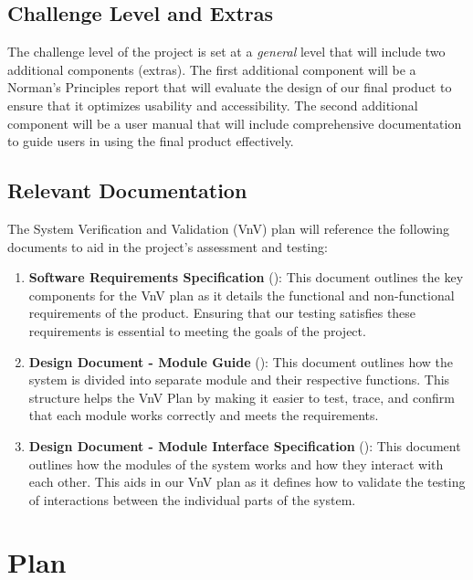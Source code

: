 \documentclass[12pt, titlepage]{article}
\begin{document}
\subsection{Challenge Level and Extras}

The challenge level of the project is set at a \textit{general} level that will include two additional 
components (extras). The first additional component will be a Norman's Principles report that will 
evaluate the design of our final product to ensure that it optimizes usability and accessibility. The second additional 
component will be a user manual that will include comprehensive documentation to guide users in using the final 
product effectively. 

\subsection{Relevant Documentation}
The System Verification and Validation (VnV) plan will reference the following documents to aid in 
the project's assessment and testing:
\begin{enumerate}
  \item \textbf{Software Requirements Specification} (\citet{SRS}): This document outlines the key components 
for the VnV plan as it details the functional and non-functional requirements of the product. Ensuring that our testing 
satisfies these requirements is essential to meeting the goals of the project.
  \item \textbf{Design Document - Module Guide} (\citet{MG}): This document outlines how the system is divided into separate module and their respective functions. 
  This structure helps the VnV Plan by making it easier to test, trace, and confirm that each module works correctly and meets the requirements.
  \item \textbf{Design Document - Module Interface Specification} (\citet{MIS}): This document outlines how the modules of the system works and how they interact with each other.
  This aids in our VnV plan as it defines how to validate the testing of interactions between the individual parts of the system.
\end{enumerate}

\section{Plan}

\end{document}
